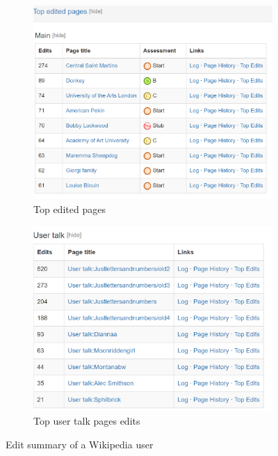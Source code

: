 \begin{figure}[!ht]
    \begin{subfigure}{0.49\textwidth}
        \centering
        \includegraphics[width=\textwidth]{images/editor_top_edits.PNG}
        \caption{Top edited pages}
        \label{fig:top-edits}
    \end{subfigure}
    \begin{subfigure}{0.49\textwidth}
        \centering
        \includegraphics[width=\textwidth]{images/editor_user_talk.PNG}
        \caption{Top user talk pages edits}
        \label{fig:user-talk-edits}
    \end{subfigure}

    \caption{Edit summary of a Wikipedia user}
    \label{fig:edit-summary}
\end{figure}

